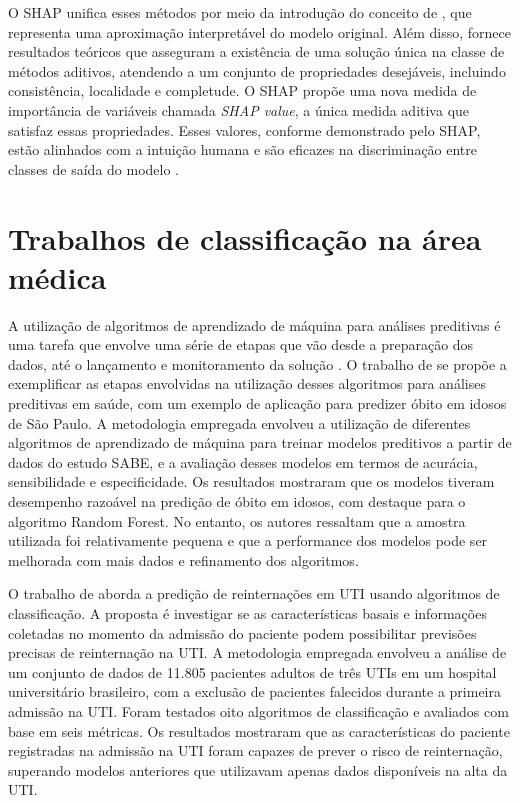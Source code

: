 O SHAP unifica esses métodos por meio da introdução do conceito de , que representa uma aproximação interpretável do modelo original. Além disso, fornece resultados teóricos que asseguram a existência de uma solução única na classe de métodos aditivos, atendendo a um conjunto de propriedades desejáveis, incluindo consistência, localidade e completude. O SHAP propõe uma nova medida de importância de variáveis chamada \textit{SHAP value}, a única medida aditiva que satisfaz essas propriedades. Esses valores, conforme demonstrado pelo SHAP, estão alinhados com a intuição humana e são eficazes na discriminação entre classes de saída do modelo \cite{Shap2017}.

\section{Trabalhos de classificação na área médica}\label{sec-context}

A utilização de algoritmos de aprendizado de máquina para análises preditivas é uma tarefa que envolve uma série de etapas que vão desde  a preparação dos dados, até o lançamento e monitoramento da solução \cite{geron2022hands}. O trabalho de  se propõe a exemplificar as etapas envolvidas na utilização desses algoritmos para análises preditivas em saúde, com um exemplo de aplicação para predizer óbito em idosos de São Paulo. A metodologia empregada envolveu a utilização de diferentes algoritmos de aprendizado de máquina para treinar modelos preditivos a partir de dados do estudo SABE, e a avaliação desses modelos em termos de acurácia, sensibilidade e especificidade. Os resultados mostraram que os modelos tiveram desempenho razoável na predição de óbito em idosos, com destaque para o algoritmo Random Forest. No entanto, os autores ressaltam que a amostra utilizada foi relativamente pequena e que a performance dos modelos pode ser melhorada com mais dados e refinamento dos algoritmos.

O trabalho de  aborda a predição de reinternações em UTI usando algoritmos de classificação. A proposta é investigar se as características basais e informações coletadas no momento da admissão do paciente podem possibilitar previsões precisas de reinternação na UTI. A metodologia empregada envolveu a análise de um conjunto de dados de 11.805 pacientes adultos de três UTIs em um hospital universitário brasileiro, com a exclusão de pacientes falecidos durante a primeira admissão na UTI. Foram testados oito algoritmos de classificação e avaliados com base em seis métricas. Os resultados mostraram que as características do paciente registradas na admissão na UTI foram capazes de prever o risco de reinternação, superando modelos anteriores que utilizavam apenas dados disponíveis na alta da UTI.

